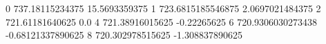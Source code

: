 0 737.18115234375 15.5693359375
1 723.6815185546875 2.0697021484375
2 721.61181640625 0.0
4 721.38916015625 -0.22265625
6 720.9306030273438 -0.68121337890625
8 720.302978515625 -1.308837890625
